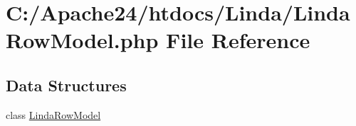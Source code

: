 \hypertarget{_linda_row_model_8php}{}\section{C\+:/\+Apache24/htdocs/\+Linda/\+Linda\+Row\+Model.php File Reference}
\label{_linda_row_model_8php}
\subsection*{Data Structures}
\begin{DoxyCompactItemize}
\item 
class \hyperlink{class_linda_row_model}{Linda\+Row\+Model}
\end{DoxyCompactItemize}
